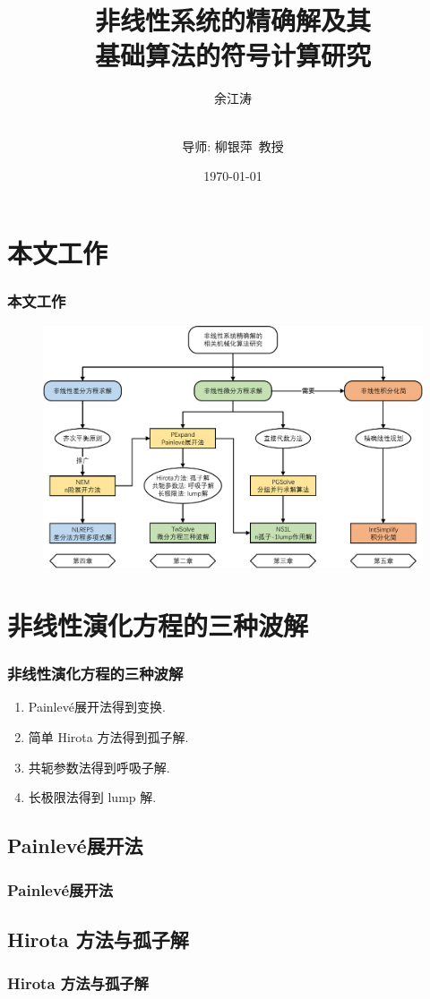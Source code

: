 \documentclass[serif]{beamer}
\title[华东师范大学硕士学位论文]{非线性系统的精确解及其\\ 基础算法的符号计算研究}
\author[余江涛]{余江涛 \and \\导师: 柳银萍~教授}
\date{\today}
\newcommand{\Painleve}{Painlev{\'e}}
\begin{document}
\frame{\titlepage}

\section{本文工作}
\begin{frame}
\frametitle{本文工作}
\begin{figure}
\centering
\includegraphics[width=\textwidth]{../paper/fig/outline.pdf} 
\end{figure}
\end{frame}

\section{非线性演化方程的三种波解}
\begin{frame}
\frametitle{非线性演化方程的三种波解}
\begin{enumerate}
\item \Painleve{}展开法得到变换.
\item 简单 Hirota 方法得到孤子解.
\item 共轭参数法得到呼吸子解.
\item 长极限法得到 lump 解.
\end{enumerate}
\end{frame}

\subsection{\Painleve{}展开法}
\begin{frame}
\frametitle{\Painleve{}展开法}
\end{frame}

\subsection{Hirota 方法与孤子解}
\begin{frame}
\frametitle{Hirota 方法与孤子解}
\end{frame}
\end{document}

